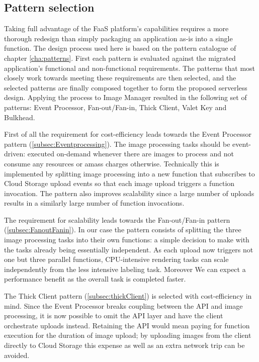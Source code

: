 \subsection{Pattern selection}

Taking full advantage of the FaaS platform's capabilities requires a more thorough redesign than simply packaging an application as-is into a single function. The design process used here is based on the pattern catalogue of chapter \ref{cha:patterns}. First each pattern is evaluated against the migrated application's functional and non-functional requirements. The patterns that most closely work towards meeting these requirements are then selected, and the selected patterns are finally composed together to form the proposed serverless design. Applying the process to Image Manager resulted in the following set of patterns: Event Processor, Fan-out/Fan-in, Thick Client, Valet Key and Bulkhead.

First of all the requirement for cost-efficiency leads towards the Event Processor pattern (\ref{subsec:Eventprocessing}). The image processing tasks should be event-driven: executed on-demand whenever there are images to process and not consume any resources or amass charges otherwise. Technically this is implemented by splitting image processing into a new function that subscribes to Cloud Storage upload events so that each image upload triggers a function invocation. The pattern also improves scalability since a large number of uploads results in a similarly large number of function invocations.

The requirement for scalability leads towards the Fan-out/Fan-in pattern (\ref{subsec:FanoutFanin}). In our case the pattern consists of splitting the three image processing tasks into their own functions: a simple decision to make with the tasks already being essentially independent. As each upload now triggers not one but three parallel functions, CPU-intensive rendering tasks can scale independently from the less intensive labeling task. Moreover We can expect a performance benefit as the overall task is completed faster.

The Thick Client pattern (\ref{subsec:thickClient}) is selected with cost-efficiency in mind. Since the Event Processor breaks coupling between the API and image processing, it is now possible to omit the API layer and have the client orchestrate uploads instead. Retaining the API would mean paying for function execution for the duration of image upload; by uploading images from the client directly to Cloud Storage this expense as well as an extra network trip can be avoided.

